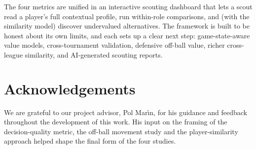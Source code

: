 \documentclass[12pt,a4paper]{article}
\begin{document}
The four metrics are unified in an interactive scouting dashboard that lets a scout read a player's full contextual profile, run within-role comparisons, and (with the similarity model) discover undervalued alternatives.
The framework is built to be honest about its own limits, and each sets up a clear next step: game-state-aware value models, cross-tournament validation, defensive off-ball value, richer cross-league similarity, and AI-generated scouting reports.

\clearpage
\section*{Acknowledgements}

We are grateful to our project advisor, Pol Mar\'{\i}n, for his guidance and feedback throughout the development of this work. His input on the framing of the decision-quality metric, the off-ball movement study and the player-similarity approach helped shape the final form of the four studies.

\end{document}
